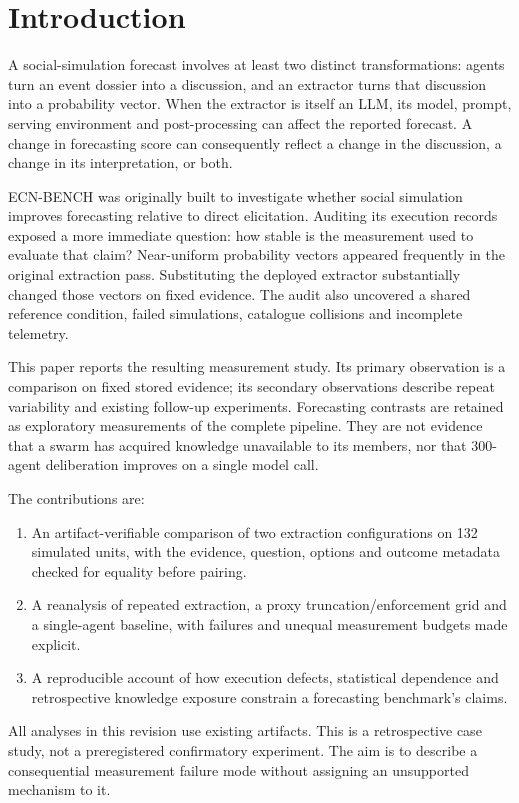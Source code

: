 \documentclass[10pt,conference]{IEEEtran}
\begin{document}
\clearpage
\tableofcontents
\clearpage
\section{Introduction}
\label{sec:intro}
A social-simulation forecast involves at least two distinct transformations:
agents turn an event dossier into a discussion, and an extractor turns that
discussion into a probability vector. When the extractor is itself an LLM,
its model, prompt, serving environment and post-processing can affect the
reported forecast. A change in forecasting score can consequently reflect a
change in the discussion, a change in its interpretation, or both.

ECN-BENCH was originally built to investigate whether social simulation improves
forecasting relative to direct elicitation. Auditing its execution records exposed
a more immediate question: how stable is the measurement used to evaluate that
claim? Near-uniform probability vectors appeared frequently in the original
extraction pass. Substituting the deployed extractor substantially changed those
vectors on fixed evidence. The audit also uncovered a shared reference condition,
failed simulations, catalogue collisions and incomplete telemetry.

This paper reports the resulting measurement study. Its primary observation is
a comparison on fixed stored evidence; its secondary observations describe
repeat variability and existing follow-up experiments. Forecasting contrasts
are retained as exploratory measurements of the complete pipeline. They are
not evidence that a swarm has acquired knowledge unavailable to its members,
nor that 300-agent deliberation improves on a single model call.

The contributions are:
\begin{enumerate}
\item An artifact-verifiable comparison of two extraction configurations on
132 simulated units, with the evidence, question, options and outcome metadata
checked for equality before pairing.
\item A reanalysis of repeated extraction, a proxy truncation/enforcement grid
and a single-agent baseline, with failures and unequal measurement budgets
made explicit.
\item A reproducible account of how execution defects, statistical dependence
and retrospective knowledge exposure constrain a forecasting benchmark's claims.
\end{enumerate}
All analyses in this revision use existing artifacts. This is a retrospective
case study, not a preregistered confirmatory experiment. The aim is to describe
a consequential measurement failure mode without assigning an unsupported
mechanism to it.
\end{document}

